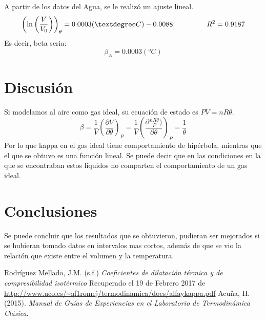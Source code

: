 \documentclass[12pt]{article}
\begin{document}
A partir de los datos del Agua, se le realizó un ajuste lineal.
\begin{equation}
\left(\ln \left(\frac{V}{V_0} \right) \right)_{\theta} = 0.0003 (°C) - 0.0088; \hspace{1.5cm} R^2 = 0.9187
\end{equation}
Es decir, beta seria:
$$\beta_{A} = 0.0003 (°C) $$



\pagebreak


\section{Discusión}
Si modelamos al aire como gas ideal, su ecuación de estado es $PV=nR\theta$.
$$\beta = \frac{1}{V} \left( \frac{\partial V}{\partial \theta} \right) _{P}
 = \frac{1}{V} \left( \frac{\partial \frac{nR\theta}{P})}{\partial \theta} \right) _{P} = \frac{1}{\theta}$$
Por lo que kappa en el gas ideal tiene comportamiento de hipérbola, mientras que el que se obtuvo es una función lineal. Se puede decir que en las condiciones en la que se encontraban estos liquidos no comparten el comportamiento de un gas ideal.
\section{Conclusiones}
Se puede concluir que los resultados que se obtuvieron, pudieran ser mejorados si se hubieran tomado datos en intervalos mas cortos, además de que se vio la relación que existe entre el volumen y la temperatura.



\begin{thebibliography}{6}
	Rodríguez Mellado, J.M. (s.f.) \textit{Coeficientes de dilatación térmica y de compresibilidad isotérmico} Recuperado el 19 de Febrero 2017 de	\url{http://www.uco.es/~qf1romej/termodinamica/docs/alfaykappa.pdf}
Acu\~na, H. (2015). \textit{Manual de Guías de Experiencias en el Laboratorio de Termodinámica Clásica}.

\end{thebibliography}
\end{document}
